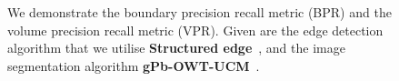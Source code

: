 \begin{figure}[ht!]
\centering
\caption[SE and gPb-OWT-UCM comparison - plots]{We demonstrate the boundary precision recall metric (BPR) and the volume precision recall metric (VPR). Given are the edge detection algorithm that we utilise {\bf Structured edge}~\cite{DollarICCV13edges}, and the image segmentation algorithm {\bf gPb-OWT-UCM}~\cite{Arbelaez11}.}
\label{fig:SE_vs_gPb_OWT_UCM}
\end{figure}

